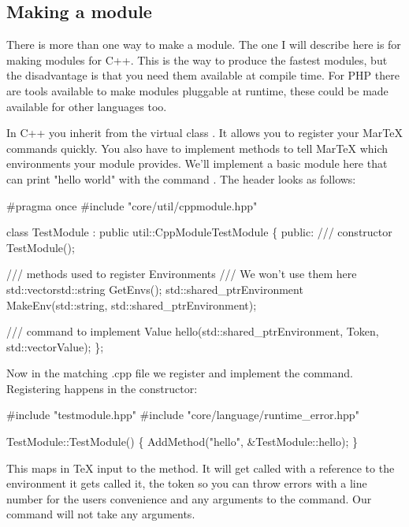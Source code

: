 \begin{page}
\section{Making a module}

There is more than one way to make a module. The one I will describe here is  for making modules for C++. This is the way to produce the fastest modules, but the disadvantage is that you need them available at compile time. For PHP there are tools available to make modules pluggable at runtime, these could be made available for other languages too.

In C++ you inherit from the virtual class . It allows you to register your MarTeX commands quickly. You also have to implement methods to tell MarTeX which environments your module provides. We'll implement a basic module here that can print "hello world" with the command . The header looks as follows:

\begin{code}
\#pragma once
\#include "core/util/cppmodule.hpp"

class TestModule : public util::CppModule\<TestModule\>
\{
  public:
    /// constructor
    TestModule();

    /// methods used to register Environments
    /// We won't use them here
    std::vector\<std::string\> GetEnvs();
    std::shared_ptr\<Environment\> MakeEnv(std::string, 
        std::shared_ptr\<Environment\>);

    /// command to implement
    Value hello(std::shared_ptr\<Environment\>, Token,
        std::vector\<Value\>);
\};
\end{code}

Now in the matching .cpp file we register and implement the command. Registering happens in the constructor:

\begin{code}
\#include "testmodule.hpp"
\#include "core/language/runtime_error.hpp"

TestModule::TestModule()
\{
    AddMethod("hello", &TestModule::hello);
\}
\end{code}

This maps  in TeX input to the  method. It will get called with a reference to the environment it gets called it, the token so you can throw errors with a line number for the users convenience and any arguments to the command. Our  command will not take any arguments.


\end{page}
